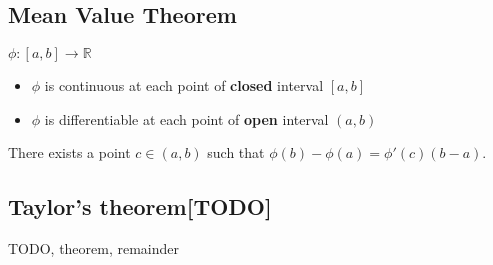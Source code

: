 \subsection{Mean Value Theorem}
	\label{thm_mvt}
	\thmIF $\phi:[a,b]\to\mathbb{R}$
	\begin{itemize}
		\item $\phi$ is continuous at each point of \textbf{closed} interval $[a, b]$
		\item $\phi$ is differentiable at each point of \textbf{open} interval $(a, b)$
	\end{itemize}
	\thmTHEN There exists a point $c \in (a,b)$ such that
		$\phi(b)-\phi(a) = \phi'(c)(b-a)$.


\subsection{Taylor’s theorem[TODO]}
\label{taylor}
TODO, theorem, remainder